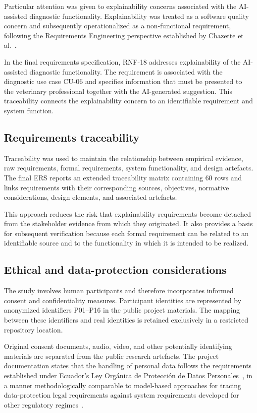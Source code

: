 \documentclass[pdflatex,sn-mathphys-num,Numbered]{sn-jnl}
\begin{document}
Particular attention was given to explainability concerns associated with the AI-assisted diagnostic functionality. Explainability was treated as a software quality concern and subsequently operationalized as a non-functional requirement, following the Requirements Engineering perspective established by Chazette et al.~\cite{chazette2020,chazette2021,chazette2022}.

In the final requirements specification, RNF-18 addresses explainability of the AI-assisted diagnostic functionality. The requirement is associated with the diagnostic use case CU-06 and specifies information that must be presented to the veterinary professional together with the AI-generated suggestion. This traceability connects the explainability concern to an identifiable requirement and system function.

\subsection{Requirements traceability}\label{subsec6}

Traceability was used to maintain the relationship between empirical evidence, raw requirements, formal requirements, system functionality, and design artefacts. The final ERS reports an extended traceability matrix containing 60 rows and links requirements with their corresponding sources, objectives, normative considerations, design elements, and associated artefacts.

This approach reduces the risk that explainability requirements become detached from the stakeholder evidence from which they originated. It also provides a basis for subsequent verification because each formal requirement can be related to an identifiable source and to the functionality in which it is intended to be realized.

\subsection{Ethical and data-protection considerations}\label{subsec7}

The study involves human participants and therefore incorporates informed consent and confidentiality measures. Participant identities are represented by anonymized identifiers P01--P16 in the public project materials. The mapping between these identifiers and real identities is retained exclusively in a restricted repository location.

Original consent documents, audio, video, and other potentially identifying materials are separated from the public research artefacts. The project documentation states that the handling of personal data follows the requirements established under Ecuador's Ley Orgánica de Protección de Datos Personales~\cite{lopdp2021}, in a manner methodologically comparable to model-based approaches for tracing data-protection legal requirements against system requirements developed for other regulatory regimes~\cite{amaral2021}.
\end{document}
